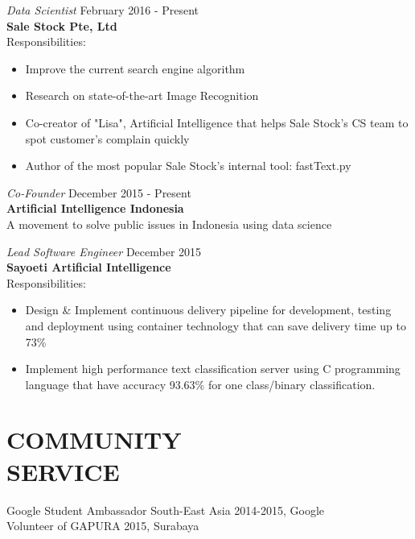 \documentclass[margin, 10pt]{res} %
\begin{document}
\begin{resume}
{\sl Data Scientist} \hfill February 2016 - Present \\
\textbf{Sale Stock Pte, Ltd} \\
Responsibilities:
\begin{itemize} \itemsep -2pt %
\item Improve the current search engine algorithm
\item Research on state-of-the-art Image Recognition
\item Co-creator of "Lisa", Artificial Intelligence that helps Sale Stock's CS team to spot customer's complain quickly
\item Author of the most popular Sale Stock's internal tool: fastText.py
\end{itemize}

{\sl Co-Founder} \hfill December 2015 - Present \\
\textbf{Artificial Intelligence Indonesia} \\
A movement to solve public issues in Indonesia using data science 
 
{\sl Lead Software Engineer} \hfill December 2015 \\
\textbf{Sayoeti Artificial Intelligence}\\
Responsibilities:
\begin{itemize} \itemsep -2pt %
\item Design \& Implement continuous delivery pipeline for development, testing and deployment using container technology that can save delivery time up to 73\%
\item Implement high performance text classification server using C programming language that have accuracy 93.63\% for one class/binary classification.
\end{itemize}


\section{COMMUNITY\\SERVICE}
Google Student Ambassador South-East Asia 2014-2015, Google\\
Volunteer of GAPURA 2015, Surabaya



\end{resume}
\end{document}
